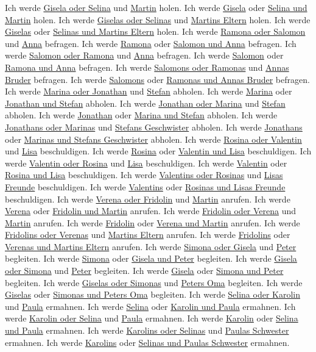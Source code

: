 \documentclass[output=paper]{langscibook}
\begin{document}
\begin{paperappendix}
\ex Ich werde \uline{Gisela oder Selina} und \uline{Martin} holen.
\ex Ich werde \uline{Gisela} oder \uline{Selina und Martin} holen.
\ex Ich werde \uline{Giselas oder Selinas} und \uline{Martins Eltern} holen.
\ex Ich werde \uline{Giselas} oder \uline{Selinas und Martins Eltern} holen.
\z
\ex
\ea Ich werde \uline{Ramona oder Salomon} und \uline{Anna} befragen.
\ex Ich werde \uline{Ramona} oder \uline{Salomon und Anna} befragen.
\ex Ich werde \uline{Salomon oder Ramona} und \uline{Anna} befragen.
\ex Ich werde \uline{Salomon} oder \uline{Ramona und Anna} befragen.
\ex Ich werde \uline{Salomons oder Ramonas} und \uline{Annas Bruder} befragen.
\ex Ich werde \uline{Salomons} oder \uline{Ramonas und Annas Bruder} befragen.
\z
\ex
\ea Ich werde \uline{Marina oder Jonathan} und \uline{Stefan} abholen.
\ex Ich werde \uline{Marina} oder \uline{Jonathan und Stefan} abholen.
\ex Ich werde \uline{Jonathan oder Marina} und \uline{Stefan} abholen.
\ex Ich werde \uline{Jonathan} oder \uline{Marina und Stefan} abholen.
\ex Ich werde \uline{Jonathans oder Marinas} und \uline{Stefans Geschwister} abholen.
\ex Ich werde \uline{Jonathans} oder \uline{Marinas und Stefans Geschwister} abholen.
\z
\ex
\ea Ich werde \uline{Rosina oder Valentin} und \uline{Lisa} beschuldigen.
\ex Ich werde \uline{Rosina} oder \uline{Valentin und Lisa} beschuldigen.
\ex Ich werde \uline{Valentin oder Rosina} und \uline{Lisa} beschuldigen.
\ex Ich werde \uline{Valentin} oder \uline{Rosina und Lisa} beschuldigen.
\ex Ich werde \uline{Valentins oder Rosinas} und \uline{Lisas Freunde} beschuldigen.
\ex Ich werde \uline{Valentins} oder \uline{Rosinas und Lisas Freunde} beschuldigen.
\z
\ex
\ea Ich werde \uline{Verena oder Fridolin} und \uline{Martin} anrufen.
\ex Ich werde \uline{Verena} oder \uline{Fridolin und Martin} anrufen.
\ex Ich werde \uline{Fridolin oder Verena} und \uline{Martin} anrufen.
\ex Ich werde \uline{Fridolin} oder \uline{Verena und Martin} anrufen.
\ex Ich werde \uline{Fridolins oder Verenas} und \uline{Martins Eltern} anrufen.
\ex Ich werde \uline{Fridolins} oder \uline{Verenas und Martins Eltern} anrufen.
\z
\ex
\ea Ich werde \uline{Simona oder Gisela} und \uline{Peter} begleiten.
\ex Ich werde \uline{Simona} oder \uline{Gisela und Peter} begleiten.
\ex Ich werde \uline{Gisela oder Simona} und \uline{Peter} begleiten.
\ex Ich werde \uline{Gisela} oder \uline{Simona und Peter} begleiten.
\ex Ich werde \uline{Giselas oder Simonas} und \uline{Peters Oma} begleiten.
\ex Ich werde \uline{Giselas} oder \uline{Simonas und Peters Oma} begleiten.
\z
\ex
\ea Ich werde \uline{Selina oder Karolin} und \uline{Paula} ermahnen.
\ex Ich werde \uline{Selina} oder \uline{Karolin und Paula} ermahnen.
\ex Ich werde \uline{Karolin oder Selina} und \uline{Paula} ermahnen.
\ex Ich werde \uline{Karolin} oder \uline{Selina und Paula} ermahnen.
\ex Ich werde \uline{Karolins oder Selinas} und \uline{Paulas Schwester} ermahnen.
\ex Ich werde \uline{Karolins} oder \uline{Selinas und Paulas Schwester} ermahnen.
\z
\z

\end{paperappendix}
\end{document}

